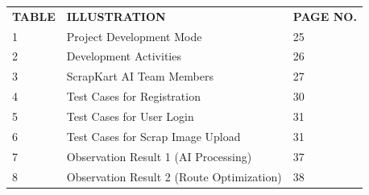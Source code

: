 \begin{center}

\renewcommand{\arraystretch}{1.7}

\begin{tabular}{p{2cm} p{8cm} p{2cm}}

\textbf{TABLE} &
\textbf{ILLUSTRATION} &
\textbf{PAGE NO.}
\\[0.6cm]

1 &
Project Development Mode &
25
\\

2 &
Development Activities &
26
\\

3 &
ScrapKart AI Team Members &
27
\\

4 &
Test Cases for Registration &
30
\\

5 &
Test Cases for User Login &
31
\\

6 &
Test Cases for Scrap Image Upload &
31
\\

7 &
Observation Result 1 (AI Processing) &
37
\\

8 &
Observation Result 2 (Route Optimization) &
38
\\

\end{tabular}

\end{center}

\clearpage
